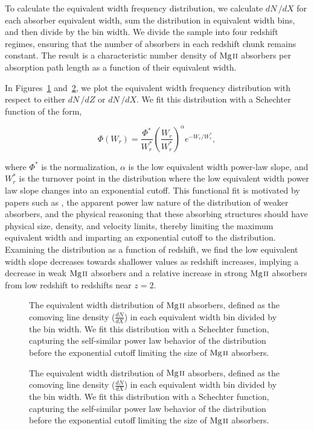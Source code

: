 \documentclass[iop,apj,numberedappendix,appendixfloats,twocolappendix]{emulateapj}
\begin{document}
To calculate the equivalent width frequency distribution, we calculate $dN\,/dX$ for each absorber equivalent width, sum the distribution in equivalent width bins, and then divide by the bin width. We divide the sample into four redshift regimes, ensuring that the number of absorbers in each redshift chunk remains constant. The result is a characteristic number density of ${\hbox{{\rm Mg}\kern 0.1em{\sc ii}}}$ absorbers per absorption path length as a function of their equivalent width.

In Figures~\ref{fig:ewdistrodndz} and~\ref{fig:ewdistrodndx}, we plot the equivalent width frequency distribution with respect to either $dN\,/dZ$ or $dN\,/dX$. We fit this distribution with a Schechter function of the form,

\begin{equation}
\Phi (W_r) = \frac{\Phi^*}{W_r^*} \left(\frac{W_r}{W_r^*}\right)^{\alpha} e^{-W_r / W_r^*} ,
\label{eqn:schechter}
\end{equation}

where $\Phi^*$ is the normalization, $\alpha$ is the low equivalent width power-law slope, and $W_r^*$ is the turnover point in the distribution where the low equivalent width power law slope changes into an exponential cutoff. This functional fit is motivated by papers such as \cite{Kacprzak2011}, the apparent power law nature of the distribution of weaker absorbers, and the physical reasoning that these absorbing structures should have physical size, density, and velocity limits, thereby limiting the maximum equivalent width and imparting an exponential cutoff to the distribution. Examining the distribution as a function of redshift, we find the low equivalent width slope decreases towards shallower values as redshift increases, implying a decrease in weak ${\hbox{{\rm Mg}\kern 0.1em{\sc ii}}}$ absorbers and a relative increase in strong ${\hbox{{\rm Mg}\kern 0.1em{\sc ii}}}$ absorbers from low redshift to redshifts near $z = 2$. 

\begin{figure*}[bth]
\caption{The equivalent width distribution of ${\hbox{{\rm Mg}\kern 0.1em{\sc ii}}}$ absorbers, defined as the comoving line density ($\frac{dN}{dX}$) in each equivalent width bin divided by the bin width. We fit this distribution with a Schechter function, capturing the self-similar power law behavior of the distribution before the exponential cutoff limiting the size of ${\hbox{{\rm Mg}\kern 0.1em{\sc ii}}}$ absorbers.}
\label{fig:ewdistrodndz}
\end{figure*}

\begin{figure*}[bth]
\caption{The equivalent width distribution of ${\hbox{{\rm Mg}\kern 0.1em{\sc ii}}}$ absorbers, defined as the comoving line density ($\frac{dN}{dX}$) in each equivalent width bin divided by the bin width. We fit this distribution with a Schechter function, capturing the self-similar power law behavior of the distribution before the exponential cutoff limiting the size of ${\hbox{{\rm Mg}\kern 0.1em{\sc ii}}}$ absorbers.}
\label{fig:ewdistrodndx}
\end{figure*}
\end{document}
